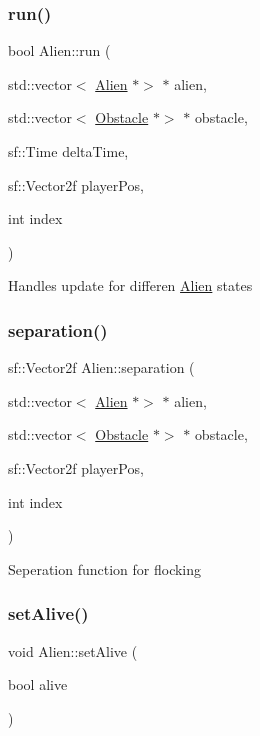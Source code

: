 \mbox{\label{class_alien_a324df6263d05f4cd623b3fc14b76afc3}} 
\subsubsection{\texorpdfstring{run()}{run()}}
{\footnotesize\ttfamily bool Alien\+::run (\begin{DoxyParamCaption}\item[{std\+::vector$<$ \hyperlink{class_alien}{Alien} $\ast$$>$ $\ast$}]{alien,  }\item[{std\+::vector$<$ \hyperlink{class_obstacle}{Obstacle} $\ast$$>$ $\ast$}]{obstacle,  }\item[{sf\+::\+Time}]{delta\+Time,  }\item[{sf\+::\+Vector2f}]{player\+Pos,  }\item[{int}]{index }\end{DoxyParamCaption})}

Handles update for differen \hyperlink{class_alien}{Alien} states \mbox{\label{class_alien_a9eaa70b12751c0fb89f23520c2a438f3}} 
\subsubsection{\texorpdfstring{separation()}{separation()}}
{\footnotesize\ttfamily sf\+::\+Vector2f Alien\+::separation (\begin{DoxyParamCaption}\item[{std\+::vector$<$ \hyperlink{class_alien}{Alien} $\ast$$>$ $\ast$}]{alien,  }\item[{std\+::vector$<$ \hyperlink{class_obstacle}{Obstacle} $\ast$$>$ $\ast$}]{obstacle,  }\item[{sf\+::\+Vector2f}]{player\+Pos,  }\item[{int}]{index }\end{DoxyParamCaption})}

Seperation function for flocking \mbox{\label{class_alien_a1f8e8072e38c88e7299867ce08e169f4}} 
\subsubsection{\texorpdfstring{set\+Alive()}{setAlive()}}
{\footnotesize\ttfamily void Alien\+::set\+Alive (\begin{DoxyParamCaption}\item[{bool}]{alive }\end{DoxyParamCaption})}

